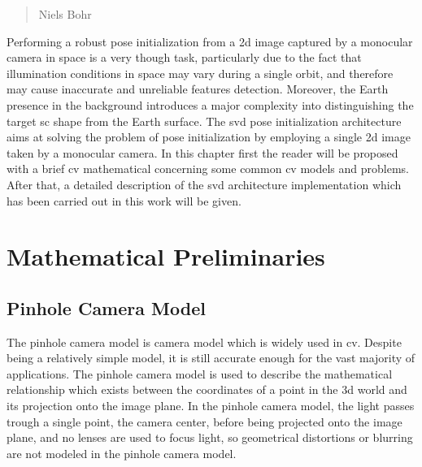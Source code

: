 \begin{quotation}
  {\footnotesize
    \begin{flushright}
      Niels Bohr
    \end{flushright}
  }
\end{quotation}
\vspace{0.5cm}

Performing a robust pose initialization from a \acrshort{2d} image captured by a monocular camera in space is a very though task, particularly due to the fact that illumination conditions in space may vary during a single orbit, and therefore may cause inaccurate and unreliable features detection. Moreover, the Earth presence in the background introduces a major complexity into distinguishing the target \acrshort{sc} shape from the Earth surface. The \acrshort{svd} pose initialization architecture aims at solving the problem of pose initialization by employing a single \acrshort{2d} image taken by a monocular camera. In this chapter first the reader will be proposed with a brief \acrfull{cv} mathematical concerning some common \acrfull{cv} models and problems. After that, a detailed description of the \acrshort{svd} architecture implementation which has been carried out in this work will be given.

\section{Mathematical Preliminaries}

\subsection{Pinhole Camera Model}\label{subsection:pinhole}
The pinhole camera model is camera model which is widely used in \acrfull{cv}. Despite being a relatively simple model, it is still accurate enough for the vast majority of applications. The pinhole camera model is used to describe the mathematical relationship which exists between the coordinates of a point in the \acrshort{3d} world and its projection onto the image plane. In the pinhole camera model, the light passes trough a single point, the camera center, before being projected onto the image plane, and no lenses are used to focus light, so geometrical distortions or blurring are not modeled in the pinhole camera model.

